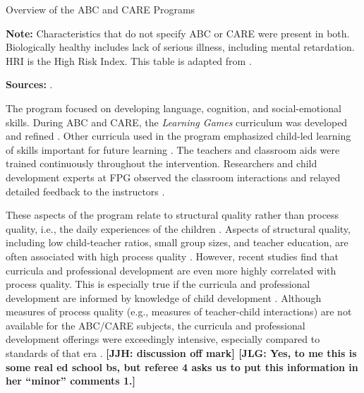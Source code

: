 \begin{table}[!htbp]
\centering
\caption{Overview of the ABC and CARE Programs}
\label{tab:abc-care-characteristics}
\begin{threeparttable}
	
\begin{tablenotes}
\footnotesize
\item \textbf{Note:} Characteristics that do not specify ABC or CARE were present in both. Biologically healthy includes lack of serious illness, including mental retardation. HRI is the High Risk Index. This table is adapted from \citet{Elango_Hojman_etal_2016_Early-Edu}. \\
\item \textbf{Sources:} \citet{Ramey_Collier_etal_1976_CarolinaAbecedarianProject,Ramey_Smith_1977_AJMD,Ramey_etal_1985_Project-CARE_TiECSE,Wasik_Ramey_etal_1990_CD,Ramey_Campbell_1991_childreninpoverty}. 
\end{tablenotes}
\end{threeparttable}
\end{table}

The program focused on developing language, cognition, and social-emotional skills. During ABC and CARE, the \textit{Learning Games} curriculum was developed and refined \citep{Sparling_Lewis_1979_BOOKLearninggamesFirstThree,Sparling_Lewis_1984_BOOKLearningGamesThreesFours}. Other curricula used in the program emphasized child-led learning of skills important for future learning \citep{Ramey_Smith_1977_AJMD, Wasik_Ramey_etal_1990_CD, Ramey_Campbell_1991_childreninpoverty}. The teachers and classroom aids were trained continuously throughout the intervention. Researchers and child development experts at FPG observed the classroom interactions and relayed detailed feedback to the instructors \citep{Ramey-etal_2012-ABC}.

These aspects of the program relate to structural quality rather than process quality, i.e., the daily experiences of the children \citep{Thomason_LaParo_2009_EED}. Aspects of structural quality, including low child-teacher ratios, small group sizes, and teacher education, are often associated with high process quality \citep{Phillipsen_etal_1997_ECRQ}. However, recent studies find that curricula and professional development are even more highly correlated with process quality. This is especially true if the curricula and professional development are informed by knowledge of child development \citep{Slot_etal_2015_Dutch_ECRQ}. Although measures of process quality (e.g., measures of teacher-child interactions) are not available for the ABC/CARE subjects, the curricula and professional development offerings were exceedingly intensive, especially compared to standards of that era \citep{Burchinal_etal_1989_CD_Daycare-Pre-K-Dev}. \textbf{[JJH: discussion off mark] [JLG: Yes, to me this is some real ed school bs, but referee 4 asks us to put this information in her ``minor'' comments 1.]}

